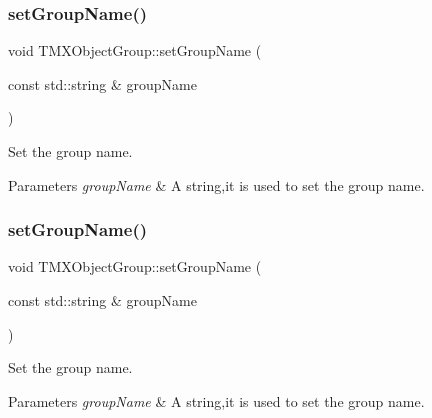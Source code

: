 \subsubsection{\texorpdfstring{set\+Group\+Name()}{setGroupName()}\hspace{0.1cm}{\footnotesize\ttfamily [1/2]}}
{\footnotesize\ttfamily void T\+M\+X\+Object\+Group\+::set\+Group\+Name (\begin{DoxyParamCaption}\item[{const std\+::string \&}]{group\+Name }\end{DoxyParamCaption})\hspace{0.3cm}{\ttfamily [inline]}}

Set the group name.


\begin{DoxyParams}{Parameters}
{\em group\+Name} & A string,it is used to set the group name. \\
\hline
\end{DoxyParams}
\mbox{\label{classTMXObjectGroup_aafffef23335ae841700cfddde5e6301c}} 
\subsubsection{\texorpdfstring{set\+Group\+Name()}{setGroupName()}\hspace{0.1cm}{\footnotesize\ttfamily [2/2]}}
{\footnotesize\ttfamily void T\+M\+X\+Object\+Group\+::set\+Group\+Name (\begin{DoxyParamCaption}\item[{const std\+::string \&}]{group\+Name }\end{DoxyParamCaption})\hspace{0.3cm}{\ttfamily [inline]}}

Set the group name.


\begin{DoxyParams}{Parameters}
{\em group\+Name} & A string,it is used to set the group name. \\
\hline
\end{DoxyParams}
\mbox{\label{classTMXObjectGroup_afa4934557f0adc40d0e8e5c8d269bf5f}} 
